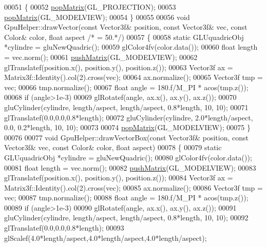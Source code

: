 \begin{DoxyCode}
00051 \{
00052     \hyperlink{class_gpu_helper_aad0cc23c2eaf0dcc610b180e5c8b195e}{popMatrix}(GL\_PROJECTION);
00053     \hyperlink{class_gpu_helper_aad0cc23c2eaf0dcc610b180e5c8b195e}{popMatrix}(GL\_MODELVIEW);
00054 \}
00055 
00056 \textcolor{keywordtype}{void} GpuHelper::drawVector(\textcolor{keyword}{const} Vector3f& position, \textcolor{keyword}{const} Vector3f& vec, \textcolor{keyword}{const} Color& color, \textcolor{keywordtype}{float} aspect \textcolor{comment}{
      /* = 50.*/})
00057 \{
00058     \textcolor{keyword}{static} GLUquadricObj *cylindre = gluNewQuadric();
00059     glColor4fv(color.data());
00060     \textcolor{keywordtype}{float} length = vec.norm();
00061     \hyperlink{class_gpu_helper_ac51c8b669a80ca6e4338c87136fb991e}{pushMatrix}(GL\_MODELVIEW);
00062     glTranslatef(position.x(), position.y(), position.z());
00063     Vector3f ax = Matrix3f::Identity().col(2).cross(vec);
00064     ax.normalize();
00065     Vector3f tmp = vec;
00066     tmp.normalize();
00067     \textcolor{keywordtype}{float} angle = 180.f/M\_PI * acos(tmp.z());
00068     \textcolor{keywordflow}{if} (angle>1e-3)
00069         glRotatef(angle, ax.x(), ax.y(), ax.z());
00070     gluCylinder(cylindre, length/aspect, length/aspect, 0.8*length, 10, 10);
00071     glTranslatef(0.0,0.0,0.8*length);
00072     gluCylinder(cylindre, 2.0*length/aspect, 0.0, 0.2*length, 10, 10);
00073 
00074     \hyperlink{class_gpu_helper_aad0cc23c2eaf0dcc610b180e5c8b195e}{popMatrix}(GL\_MODELVIEW);
00075 \}
00076 
00077 \textcolor{keywordtype}{void} GpuHelper::drawVectorBox(\textcolor{keyword}{const} Vector3f& position, \textcolor{keyword}{const} Vector3f& vec, \textcolor{keyword}{const} Color& color, \textcolor{keywordtype}{float} 
      aspect)
00078 \{
00079     \textcolor{keyword}{static} GLUquadricObj *cylindre = gluNewQuadric();
00080     glColor4fv(color.data());
00081     \textcolor{keywordtype}{float} length = vec.norm();
00082     \hyperlink{class_gpu_helper_ac51c8b669a80ca6e4338c87136fb991e}{pushMatrix}(GL\_MODELVIEW);
00083     glTranslatef(position.x(), position.y(), position.z());
00084     Vector3f ax = Matrix3f::Identity().col(2).cross(vec);
00085     ax.normalize();
00086     Vector3f tmp = vec;
00087     tmp.normalize();
00088     \textcolor{keywordtype}{float} angle = 180.f/M\_PI * acos(tmp.z());
00089     \textcolor{keywordflow}{if} (angle>1e-3)
00090         glRotatef(angle, ax.x(), ax.y(), ax.z());
00091     gluCylinder(cylindre, length/aspect, length/aspect, 0.8*length, 10, 10);
00092     glTranslatef(0.0,0.0,0.8*length);
00093     glScalef(4.0*length/aspect,4.0*length/aspect,4.0*length/aspect);

\end{DoxyCode}
